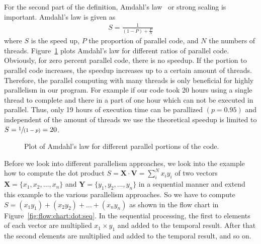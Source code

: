 For the second part of the definition, Amdahl's law~\cite{amdahl1967validity} or strong scaling is important. Amdahl's law is given as
\begin{align}
S = \frac{1}{(1-P) + \frac{P}{N}}
\end{align}
where $S$ is the speed up, $P$ the proportion of parallel code, and $N$ the numbers of threads. Figure~\ref{fig:amdals:law} plots Amdahl's law for different ratios of parallel code. Obviously, for zero percent parallel code, there is no speedup. If the portion to parallel code increases, the speedup increases up to a certain amount of threads. Therefore, the parallel computing with many threads is only beneficial for highly parallelism in our program. For example if our code took 20 hours using a single thread to complete and there in a part of one hour which can not be executed in parallel. Thus, only 19 hours of execution time can be parallized $(p=0.95)$ and independent of the amount of threads we use the theoretical speedup is limited to $S=\sfrac{1}{(1-p)}=20$.\\

\begin{figure}[tb]
\centering
\caption{Plot of Amdahl's law for different parallel portions of the code.}
\label{fig:amdals:law}
\end{figure}

Before we look into different parallelism approaches, we look into the example how to compute the dot product $S = \mathbf{X} \cdot \mathbf{V} = \sum_i^N x_i y_i$ of two vectors $\mathbf{X} = \lbrace x_1,x_2,\ldots,x_n \rbrace$ and $\mathbf{Y} = \lbrace y_1,y_2,\ldots,y_n \rbrace$  in a sequential manner and extend this example to the various parallelism approaches. So we have to compute $S = (x_1y_1) + (x_2y_2) + \ldots + (x_n y_n)$ as shown in the flow chart in Figure~\ref{fig:flow:chart:dot:seq}. In the sequential processing, the first to elements of each vector are multiplied $x_1 \times y_1$ and added to the temporal result. After that the second elements are multiplied and added to the temporal result, and so on. \\

